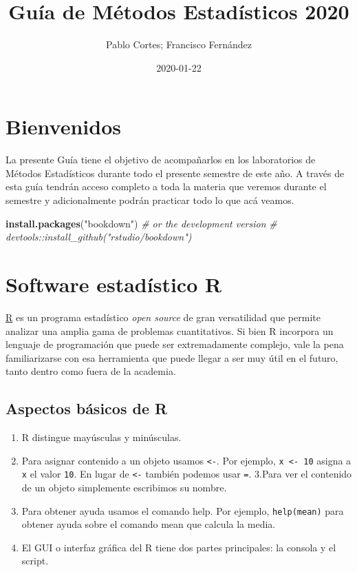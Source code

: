\documentclass[]{book}
\title{Guía de Métodos Estadísticos 2020}
\author{Pablo Cortes; Francisco Fernández}
\date{2020-01-22}
\newenvironment{Shaded}{\begin{snugshade}}{\end{snugshade}}
\newcommand{\CommentTok}[1]{\textcolor[rgb]{0.56,0.35,0.01}{\textit{#1}}}
\newcommand{\KeywordTok}[1]{\textcolor[rgb]{0.13,0.29,0.53}{\textbf{#1}}}
\newcommand{\NormalTok}[1]{#1}
\newcommand{\StringTok}[1]{\textcolor[rgb]{0.31,0.60,0.02}{#1}}
\providecommand{\tightlist}{%
  \setlength{\itemsep}{0pt}\setlength{\parskip}{0pt}}
\begin{document}
\maketitle

{
\setcounter{tocdepth}{1}
\tableofcontents
}
\hypertarget{bienvenidos}{%
\chapter*{Bienvenidos}\label{bienvenidos}}

La presente Guía tiene el objetivo de acompañarlos en los laboratorios de Métodos Estadísticos durante todo el presente semestre de este año. A través de esta guía tendrán acceso completo a toda la materia que veremos durante el semestre y adicionalmente podrán practicar todo lo que acá veamos.

\begin{Shaded}
\begin{Highlighting}[]
\KeywordTok{install.packages}\NormalTok{(}\StringTok{"bookdown"}\NormalTok{)}
\CommentTok{# or the development version}
\CommentTok{# devtools::install_github("rstudio/bookdown")}
\end{Highlighting}
\end{Shaded}

\hypertarget{intro}{%
\chapter{Software estadístico R}\label{intro}}

\href{https://cran.r-project.org}{R} es un programa estadístico \emph{open source} de gran versatilidad que permite analizar una amplia gama de problemas cuantitativos. Si bien R incorpora un lenguaje de programación que puede ser extremadamente complejo, vale la pena familiarizarse con esa herramienta que puede llegar a ser muy útil en el futuro, tanto dentro como fuera de la academia.

\hypertarget{aspectos-basicos-de-r}{%
\section{Aspectos básicos de R}\label{aspectos-basicos-de-r}}

\begin{enumerate}
\def\labelenumi{\arabic{enumi}.}
\tightlist
\item
  R distingue mayúsculas y minúsculas.
\item
  Para asignar contenido a un objeto usamos \texttt{\textless{}-}. Por ejemplo, \texttt{x\ \textless{}-\ 10} asigna a \texttt{x} el valor \texttt{10}. En lugar de \texttt{\textless{}-} también podemos usar \texttt{=}.
  3.Para ver el contenido de un objeto simplemente escribimos su nombre.
\item
  Para obtener ayuda usamos el comando help. Por ejemplo, \texttt{help(mean)} para obtener ayuda sobre el comando mean que calcula la media.
\item
  El GUI o interfaz gráfica del R tiene dos partes principales: la consola y el script.
\end{enumerate}
\end{document}
